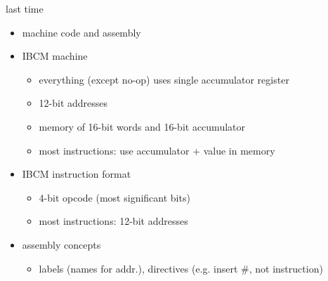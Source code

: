 \begin{frame}{last time}
    \begin{itemize}
    \item machine code and assembly
    \item IBCM machine
        \begin{itemize}
        \item everything (except no-op) uses single accumulator register
        \item 12-bit addresses
        \item memory of 16-bit words and 16-bit accumulator
        \item most instructions: use accumulator + value in memory
        \end{itemize}
    \item IBCM instruction format
        \begin{itemize}
        \item 4-bit opcode (most significant bits)
        \item most instructions: 12-bit addresses
        \end{itemize}
    \item assembly concepts
    \begin{itemize}\item  labels (names for addr.), directives (e.g. insert \#, not instruction)\end{itemize}
    \end{itemize}
\end{frame}
